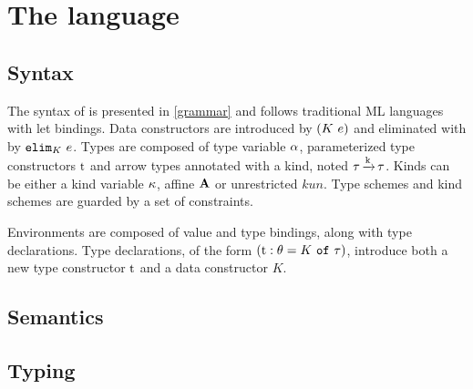 \section{The \lang language}

\subsection{Syntax}

The syntax of \lang is presented in \cref{grammar} and follows
traditional ML languages with let bindings.
Data constructors are introduced by $(K\ e)$ and eliminated
with by $\mathtt{elim}_{K}\ e$.
Types are composed of type variable $\alpha$, parameterized type constructors
$\mathrm{t}$ and arrow types annotated with a kind, noted $\tau \operatorname{\xrightarrow{k}} \tau$.
Kinds can be either a kind variable $\kappa$, affine $\mathbf{A}$ or unrestricted $kun$.
Type schemes and kind schemes are guarded by a set of constraints.

Environments are composed of value and type bindings, along with type
declarations. Type declarations, of the form
$(\mathrm{t} : \theta = K\ \mathtt{of}\ \tau)$, introduce both a new type constructor $\mathrm{t}$ and
a data constructor $K$.

\begin{figure*}[h]
  \centering
  
  \caption{Syntax}
  \label{grammar}
\end{figure*}

\subsection{Semantics}

\TODO{}
%   


\subsection{Typing}


